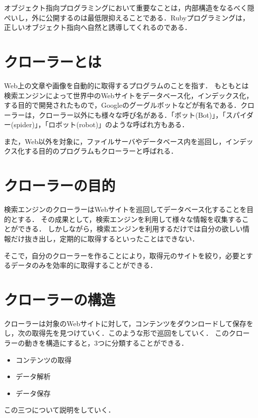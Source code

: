 オブジェクト指向プログラミングにおいて重要なことは，内部構造をなるべく隠ぺいし，外に公開するのは最低限抑えることである．Rubyプログラミングは，正しいオブジェクト指向へ自然と誘導してくれるのである\cite{miyake}．



\section{クローラーとは}
Web上の文章や画像を自動的に取得するプログラムのことを指す．
もともとは検索エンジンによって世界中のWebサイトをデータベース化，インデックス化，する目的で開発されたもので，Googleのグーグルボットなどが有名である．クローラーは，クローラー以外にも様々な呼び名がある．「ボット(Bot)」，「スパイダー(spider)」，「ロボット(robot)」のような呼ばれ方もある．

また，Web以外を対象に，ファイルサーバやデータベース内を巡回し，インデックス化する目的のプログラムもクローラーと呼ばれる\cite{miyake}．




\section{クローラーの目的}
検索エンジンのクローラーはWebサイトを巡回してデータベース化することを目的とする．
その成果として，検索エンジンを利用して様々な情報を収集することができる．
しかしながら，検索エンジンを利用するだけでは自分の欲しい情報だけ抜き出し，定期的に取得するといったことはできない．

そこで，自分のクローラーを作ることにより，取得元のサイトを絞り，必要とするデータのみを効率的に取得することができる\cite{miyake}．


\section{クローラーの構造}

クローラーは対象のWebサイトに対して，コンテンツをダウンロードして保存をし，次の取得先を見つけていく．このような形で巡回をしていく．
このクローラーの動きを構造にすると，3つに分類することができる．

\begin{itemize}
  \item コンテンツの取得
  \item データ解析
  \item データ保存
\end{itemize}


この三つについて説明をしていく\cite{miyake}．


